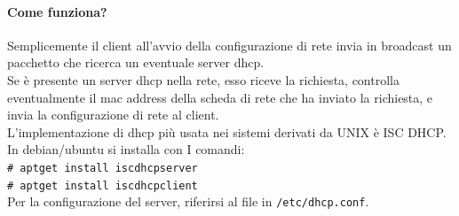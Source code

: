\documentclass[a4paper]{report}
\newcommand\tab[1][1cm]{\hspace*{#1}}
\begin{document}
\paragraph{Come funziona?} Semplicemente il client all'avvio della
configurazione di rete invia in broadcast un
pacchetto che ricerca un eventuale server
dhcp.\\ Se è presente un server dhcp nella rete, esso
riceve la richiesta, controlla eventualmente il
mac address della scheda di rete che ha inviato
la richiesta, e invia la configurazione di rete al
client.\\
L'implementazione di dhcp più usata nei sistemi
derivati da UNIX è ISC DHCP.\\
In debian/ubuntu si installa con I comandi:\\
\texttt{\tab \# aptget
install iscdhcpserver\\
\tab \# aptget
install iscdhcpclient}\\
Per la configurazione del server, riferirsi al file in \texttt{/etc/dhcp.conf}.\\
\end{document}
